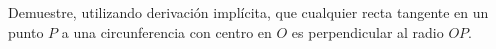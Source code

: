 \item Demuestre, utilizando derivación implícita, que cualquier recta tangente en un punto $P$ a una circunferencia con centro en $O$ es perpendicular al radio $OP$.
